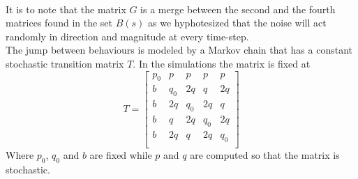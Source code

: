 \documentclass[twocolumn]{article}
\begin{document}
    \\
    It is to note that the matrix $G$ is a merge between the second and the fourth matrices found in the set $B(s)$ as we hyphotesized that 
     the noise will act randomly in direction and magnitude at every time-step.
\\
The jump between behaviours is modeled by a Markov chain that has a constant stochastic transition matrix $T$.
In the simulations the matrix is fixed at
\begin{equation*}
    T=\begin{bmatrix}
        p_{0}&p&p&p&p\\
        b&q_{0}&2q&q&2q\\
        b&2q&q_{0}&2q&q\\
        b&q&2q&q_{0}&2q\\
        b&2q&q&2q&q_{0}\\
    \end{bmatrix}
\end{equation*}
Where $p_{0}$, $q_{0}$ and $b$ are fixed while $p$ and $q$ are computed so that the matrix is stochastic.
\end{document}
